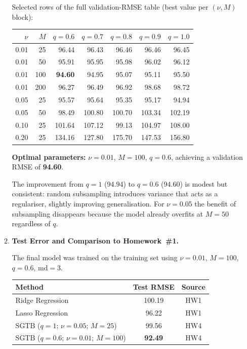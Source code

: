 \documentclass[a4paper,12pt]{article}
\begin{document}
\begin{enumerate}
\begin{enumerate}[label=(\alph*)]
Selected rows of the full validation-RMSE table (best value per $(\nu, M)$ block):

\begin{center}
\small
\begin{tabular}{rr|rrrrr}
\toprule
$\nu$ & $M$ & $q=0.6$ & $q=0.7$ & $q=0.8$ & $q=0.9$ & $q=1.0$ \\
\midrule
0.01 &  25 & 96.44 & 96.43 & 96.46 & 96.46 & 96.45 \\
0.01 &  50 & 95.91 & 95.95 & 95.98 & 96.02 & 96.12 \\
0.01 & 100 & \textbf{94.60} & 94.95 & 95.07 & 95.11 & 95.50 \\
0.01 & 200 & 96.27 & 96.49 & 96.92 & 98.68 & 98.72 \\
0.05 &  25 & 95.57 & 95.64 & 95.35 & 95.17 & 94.94 \\
0.05 &  50 & 98.49 & 100.80 & 100.70 & 103.34 & 102.19 \\
0.10 &  25 & 101.64 & 107.12 & 99.13 & 104.97 & 108.00 \\
0.20 &  25 & 134.16 & 127.80 & 175.70 & 147.53 & 156.80 \\
\bottomrule
\end{tabular}
\end{center}

\textbf{Optimal parameters:} $\nu = 0.01$, $M = 100$, $q = 0.6$,
achieving a validation RMSE of \textbf{94.60}.

The improvement from $q=1$ (94.94) to $q=0.6$ (94.60) is modest but consistent: random
subsampling introduces variance that acts as a regulariser, slightly improving
generalisation. For $\nu=0.05$ the benefit of subsampling disappears because the model
already overfits at $M=50$ regardless of $q$.

\item \textbf{Test Error and Comparison to Homework~\#1.}

The final model was trained on the training set using $\nu=0.01$, $M=100$, $q=0.6$,
$\mathrm{md}=3$.

\begin{center}
\begin{tabular}{lcc}
\toprule
Method & Test RMSE & Source \\
\midrule
Ridge Regression                       & 100.19 & HW1 \\
Lasso Regression                       &  96.22 & HW1 \\
SGTB ($q=1$; $\nu=0.05$; $M=25$)      &  99.56 & HW4 \\
SGTB ($q=0.6$; $\nu=0.01$; $M=100$)   &  \textbf{92.49} & HW4 \\
\bottomrule
\end{tabular}
\end{center}


\end{enumerate}
\end{enumerate}
\end{document}
